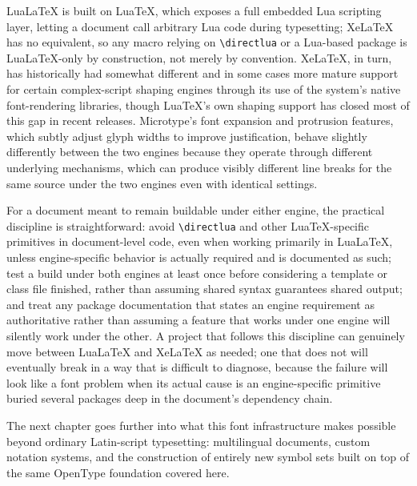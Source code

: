 LuaLaTeX is built on LuaTeX, which exposes a full embedded Lua scripting layer, letting a document call arbitrary Lua code during typesetting; XeLaTeX has no equivalent, so any macro relying on \texttt{\textbackslash{}directlua} or a Lua-based package is LuaLaTeX-only by construction, not merely by convention. XeLaTeX, in turn, has historically had somewhat different and in some cases more mature support for certain complex-script shaping engines through its use of the system's native font-rendering libraries, though LuaTeX's own shaping support has closed most of this gap in recent releases. Microtype's font expansion and protrusion features, which subtly adjust glyph widths to improve justification, behave slightly differently between the two engines because they operate through different underlying mechanisms, which can produce visibly different line breaks for the same source under the two engines even with identical  settings.

For a document meant to remain buildable under either engine, the practical discipline is straightforward: avoid \texttt{\textbackslash{}directlua} and other LuaTeX-specific primitives in document-level code, even when working primarily in LuaLaTeX, unless engine-specific behavior is actually required and is documented as such; test a build under both engines at least once before considering a template or class file finished, rather than assuming shared  syntax guarantees shared output; and treat any package documentation that states an engine requirement as authoritative rather than assuming a feature that works under one engine will silently work under the other. A project that follows this discipline can genuinely move between LuaLaTeX and XeLaTeX as needed; one that does not will eventually break in a way that is difficult to diagnose, because the failure will look like a font problem when its actual cause is an engine-specific primitive buried several packages deep in the document's dependency chain.

The next chapter goes further into what this font infrastructure makes possible beyond ordinary Latin-script typesetting: multilingual documents, custom notation systems, and the construction of entirely new symbol sets built on top of the same OpenType foundation covered here.
